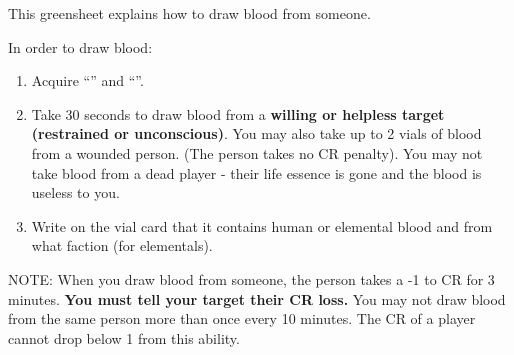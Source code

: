 \documentclass[green]{elementals}
\begin{document}
\name{\gDrawBlood{}} 

This greensheet explains how to draw blood from someone.

In order to draw blood:
\begin{enumerate}
\item Acquire ``\iVial{}'' and ``\iSyringe{}''. 
\item Take 30 seconds to draw blood from a {\bf willing or helpless target (restrained or unconscious)}. You may also take up to 2 vials of blood from a wounded person. (The person takes no CR penalty). You may not take blood from a dead player - their life essence is gone and the blood is useless to you.
\item Write on the vial card that it contains human or elemental blood and from what faction (for elementals). 
\end{enumerate}

NOTE: When you draw blood from someone, the person takes a -1 to CR for 3 minutes. {\bf You must tell your target their CR loss.} You may not draw blood from the same person more than once every 10 minutes.  The CR of a player cannot drop below 1 from this ability.
\end{document}
